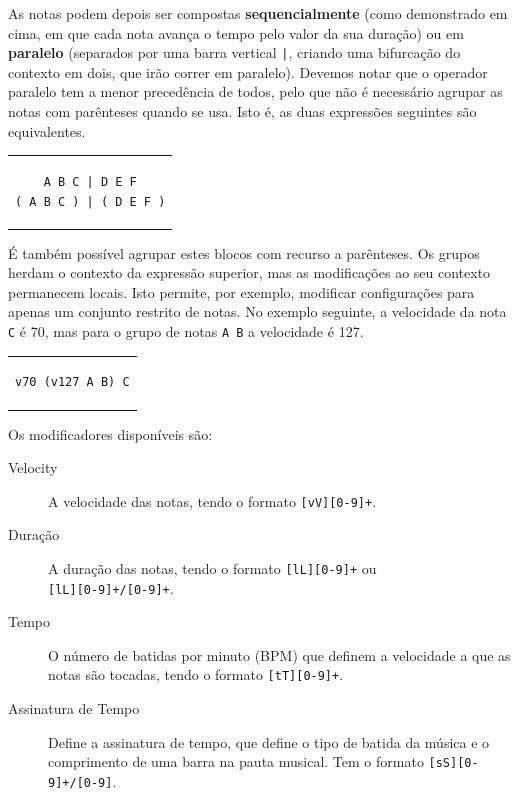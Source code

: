 \documentclass[
  oneside,
  11pt, a4paper,
  footinclude=true,
  headinclude=true,
  cleardoublepage=empty
]{scrbook}
\begin{document}
As notas podem depois ser compostas \textbf{sequencialmente} (como demonstrado em cima, em que cada nota avança o tempo pelo valor da sua duração) ou em \textbf{paralelo} (separados por uma barra vertical \texttt{|}, criando uma bifurcação do contexto em dois, que irão correr em paralelo). Devemos notar que o operador paralelo tem a menor precedência de todos, pelo que não é necessário agrupar as notas com parênteses quando se usa. Isto é, as duas expressões seguintes são equivalentes.

\begin{center}
\begin{tabular}{c}
\begin{lstlisting}[backgroundcolor=\color{transparent}]
    A B C | D E F
( A B C ) | ( D E F )
\end{lstlisting}
\end{tabular}
\end{center}

É também possível agrupar estes blocos com recurso a parênteses. Os grupos herdam o contexto da expressão superior, mas as modificações ao seu contexto permanecem locais. Isto permite, por exemplo, modificar configurações para apenas um conjunto restrito de notas. No exemplo seguinte, a velocidade da nota \texttt{C} é 70, mas para o grupo de notas \texttt{A B} a velocidade é 127.

\begin{center}
\begin{tabular}{c}
\begin{lstlisting}[backgroundcolor=\color{transparent}]
 v70 (v127 A B) C
\end{lstlisting}
\end{tabular}
\end{center}

Os modificadores disponíveis são:
\begin{description}
 \item[Velocity] A velocidade das notas, tendo o formato \texttt{[vV][0-9]+}.
 \item[Duração] A duração das notas, tendo o formato \texttt{[lL][0-9]+} ou \\ \texttt{[lL][0-9]+/[0-9]+}.
 \item[Tempo] O número de batidas por minuto (BPM) que definem a velocidade a que as notas são tocadas, tendo o formato \texttt{[tT][0-9]+}.
 \item[Assinatura de Tempo] Define a assinatura de tempo, que define o tipo de batida da música e o comprimento de uma barra na pauta musical. Tem o formato \texttt{[sS][0-9]+/[0-9]}.
\end{description}
\end{document}
